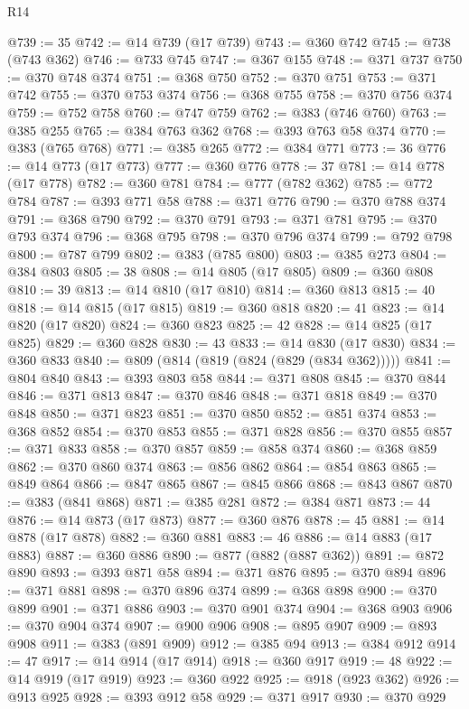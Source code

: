 \begin{lexlean}{R14}
\begin{coremodule}
@739 := 35
@742 := @14 @739 (@17 @739)
@743 := @360 @742
@745 := @738 (@743 @362)
@746 := @733 @745
@747 := @367 @155
@748 := @371 @737
@750 := @370 @748 @374
@751 := @368 @750
@752 := @370 @751
@753 := @371 @742
@755 := @370 @753 @374
@756 := @368 @755
@758 := @370 @756 @374
@759 := @752 @758
@760 := @747 @759
@762 := @383 (@746 @760)
@763 := @385 @255
@765 := @384 @763 @362
@768 := @393 @763 @58 @374
@770 := @383 (@765 @768)
@771 := @385 @265
@772 := @384 @771
@773 := 36
@776 := @14 @773 (@17 @773)
@777 := @360 @776
@778 := 37
@781 := @14 @778 (@17 @778)
@782 := @360 @781
@784 := @777 (@782 @362)
@785 := @772 @784
@787 := @393 @771 @58
@788 := @371 @776
@790 := @370 @788 @374
@791 := @368 @790
@792 := @370 @791
@793 := @371 @781
@795 := @370 @793 @374
@796 := @368 @795
@798 := @370 @796 @374
@799 := @792 @798
@800 := @787 @799
@802 := @383 (@785 @800)
@803 := @385 @273
@804 := @384 @803
@805 := 38
@808 := @14 @805 (@17 @805)
@809 := @360 @808
@810 := 39
@813 := @14 @810 (@17 @810)
@814 := @360 @813
@815 := 40
@818 := @14 @815 (@17 @815)
@819 := @360 @818
@820 := 41
@823 := @14 @820 (@17 @820)
@824 := @360 @823
@825 := 42
@828 := @14 @825 (@17 @825)
@829 := @360 @828
@830 := 43
@833 := @14 @830 (@17 @830)
@834 := @360 @833
@840 := @809 (@814 (@819 (@824 (@829 (@834 @362)))))
@841 := @804 @840
@843 := @393 @803 @58
@844 := @371 @808
@845 := @370 @844
@846 := @371 @813
@847 := @370 @846
@848 := @371 @818
@849 := @370 @848
@850 := @371 @823
@851 := @370 @850
@852 := @851 @374
@853 := @368 @852
@854 := @370 @853
@855 := @371 @828
@856 := @370 @855
@857 := @371 @833
@858 := @370 @857
@859 := @858 @374
@860 := @368 @859
@862 := @370 @860 @374
@863 := @856 @862
@864 := @854 @863
@865 := @849 @864
@866 := @847 @865
@867 := @845 @866
@868 := @843 @867
@870 := @383 (@841 @868)
@871 := @385 @281
@872 := @384 @871
@873 := 44
@876 := @14 @873 (@17 @873)
@877 := @360 @876
@878 := 45
@881 := @14 @878 (@17 @878)
@882 := @360 @881
@883 := 46
@886 := @14 @883 (@17 @883)
@887 := @360 @886
@890 := @877 (@882 (@887 @362))
@891 := @872 @890
@893 := @393 @871 @58
@894 := @371 @876
@895 := @370 @894
@896 := @371 @881
@898 := @370 @896 @374
@899 := @368 @898
@900 := @370 @899
@901 := @371 @886
@903 := @370 @901 @374
@904 := @368 @903
@906 := @370 @904 @374
@907 := @900 @906
@908 := @895 @907
@909 := @893 @908
@911 := @383 (@891 @909)
@912 := @385 @94
@913 := @384 @912
@914 := 47
@917 := @14 @914 (@17 @914)
@918 := @360 @917
@919 := 48
@922 := @14 @919 (@17 @919)
@923 := @360 @922
@925 := @918 (@923 @362)
@926 := @913 @925
@928 := @393 @912 @58
@929 := @371 @917
@930 := @370 @929

\end{coremodule}
\end{lexlean}
